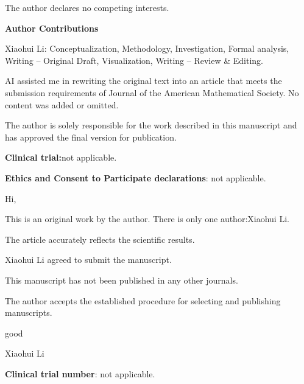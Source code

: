 \documentclass[a4paper,11pt]{article}
\begin{document}
The author declares no competing interests.

 \textbf{\textbf{Author Contributions}}

Xiaohui Li: Conceptualization, Methodology, Investigation, Formal analysis, Writing – Original Draft, Visualization, Writing – Review \& Editing.

AI assisted me in rewriting the original text into an article that meets the submission requirements of Journal of the American Mathematical Society. No content was added or omitted.

 The author is solely responsible for the work described in this manuscript and has approved the final version for publication.

 \textbf{\textbf{Clinical trial:}}not applicable.

 \textbf{\textbf{Ethics and Consent to Participate declarations}}: not applicable.

 Hi,

This is an original work by the author. There is only one author:Xiaohui Li.

The article accurately reflects the scientific results.

Xiaohui Li agreed to submit the manuscript.

This manuscript has not been published in any other journals.

The author accepts the established procedure for selecting and publishing manuscripts.

good

Xiaohui Li



 \textbf{\textbf{Clinical trial number}}: not applicable.
\end{document}

